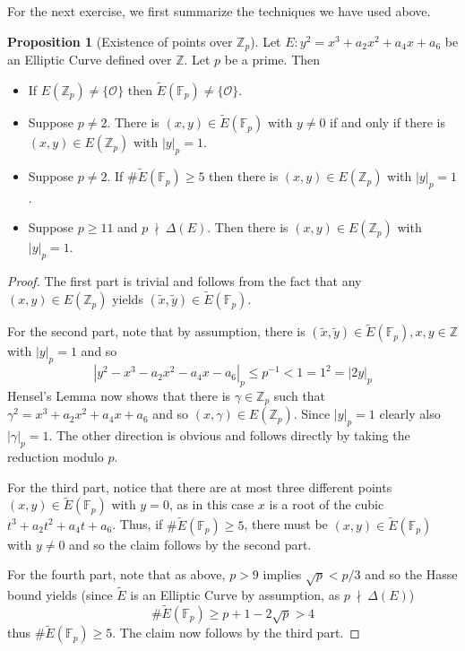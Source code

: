 \documentclass{scrartcl}
\newcommand{\Z}{\mathbb{Z}}
\newcommand{\F}{\mathbb{F}}
\renewcommand{\O}{\mathcal{O}}
\newcommand{\notdivides}{\ \nmid \ }
\theoremstyle{definition}
\newtheorem{prop}[subsection]{Proposition}
\begin{document}
For the next exercise, we first summarize the techniques we have used above.
\begin{prop}[Existence of points over $\Z_p$]
    \label{prop:p_adic_points_techniques}
    Let $E: y^2 = x^3 + a_2 x^2 + a_4 x + a_6$ be an Elliptic Curve defined over $\Z$.
    Let $p$ be a prime.
    Then
    \begin{itemize}
        \item If $E(\Z_p) \neq \{\O\}$ then $\tilde{E}(\F_p) \neq \{\O\}$.
        \item Suppose $p \neq 2$. There is $(x, y) \in \tilde{E}(\F_p)$ with $y \neq 0$ if and only if there is $(x, y) \in E(\Z_p)$ with $|y|_p = 1$.
        \item Suppose $p \neq 2$. If $\#\tilde{E}(\F_p) \geq 5$ then there is $(x, y) \in E(\Z_p)$ with $|y|_p = 1$.
        \item Suppose $p \geq 11$ and $p \notdivides \Delta(E)$. Then there is $(x, y) \in E(\Z_p)$ with $|y|_p = 1$.
    \end{itemize}
\end{prop}
\begin{proof}
    The first part is trivial and follows from the fact that any $(x, y) \in E(\Z_p)$ yields $(\tilde{x}, \tilde{y}) \in \tilde{E}(\F_p)$.

    For the second part, note that by assumption, there is $(\tilde{x}, \tilde{y}) \in \tilde{E}(\F_p), x, y \in \Z$ with $|y|_p = 1$ and so
    \begin{equation*}
        |y^2 - x^3 - a_2 x^2 - a_4 x - a_6|_p \leq p^{-1} < 1 = 1^2 = |2y|_p
    \end{equation*}
    Hensel's Lemma now shows that there is $\gamma \in \Z_p$ such that $\gamma^2 = x^3 + a_2 x^2 + a_4 x + a_6$ and so $(x, \gamma) \in E(\Z_p)$.
    Since $|y|_p = 1$ clearly also $|\gamma|_p = 1$.
    The other direction is obvious and follows directly by taking the reduction modulo $p$.

    For the third part, notice that there are at most three different points $(x, y) \in \tilde{E}(\F_p)$ with $y = 0$, as in this case $x$ is a root of the cubic $t^3 + a_2 t^2 + a_4 t + a_6$.
    Thus, if $\#\tilde{E}(\F_p) \geq 5$, there must be $(x, y) \in \tilde{E}(\F_p)$ with $y \neq 0$ and so the claim follows by the second part.

    For the fourth part, note that as above, $p > 9$ implies $\sqrt{p} < p/3$ and so the Hasse bound yields (since $\tilde{E}$ is an Elliptic Curve by assumption, as $p \notdivides \Delta(E)$)
    \begin{equation*}
        \#\tilde{E}(\F_p) \geq p + 1 - 2\sqrt{p} > 4
    \end{equation*}
    thus $\#\tilde{E}(\F_p) \geq 5$. 
    The claim now follows by the third part.
\end{proof}
\end{document}
